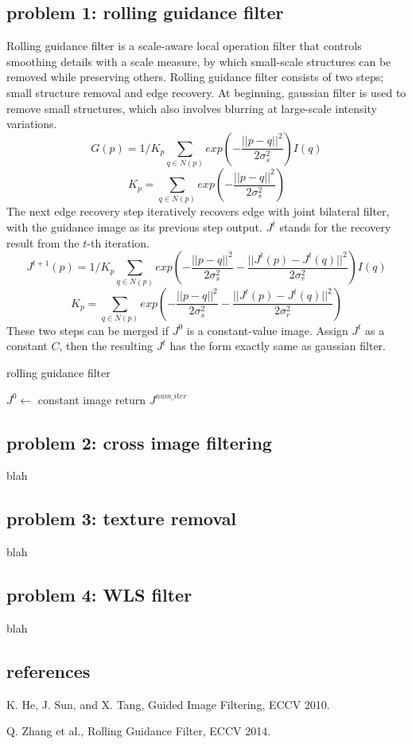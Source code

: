 \documentclass[extendedabs]{bmvc2k}
\begin{document}
\subsection*{problem 1: rolling guidance filter}

Rolling guidance filter \cite{rolling} is a scale-aware local operation filter that controls smoothing
details with a scale measure, by which small-scale structures can be removed while preserving others.
Rolling guidance filter consists of two steps; small structure removal and edge recovery.
At beginning, gaussian filter is used to remove small structures, which also involves blurring at
large-scale intensity variations.
\[G(p) = 1/K_p\sum_{q \in N(p)}exp(-\frac{||p-q||^2}{2\sigma_s^2})I(q)\]
\[K_p = \sum_{q \in N(p)}exp(-\frac{||p-q||^2}{2\sigma_s^2})\]
The next edge recovery step iteratively recovers edge with joint bilateral filter, with the guidance
image as its previous step output. $J^t$ stands for the recovery result from the $t$-th iteration.
\[J^{t+1}(p) = 1/K_p\sum_{q \in N(p)}exp(-\frac{||p-q||^2}{2\sigma_s^2}-\frac{||J^t(p)-J^t(q)||^2}{2\sigma_r^2})I(q)\]
\[K_p = \sum_{q \in N(p)}exp(-\frac{||p-q||^2}{2\sigma_s^2}-\frac{||J^t(p)-J^t(q)||^2}{2\sigma_r^2})\]
These two steps can be merged if $J^0$ is a constant-value image. Assign $J^t$ as a constant $C$, then
the resulting $J^t$ has the form exactly same as gaussian filter.

\begin{algorithm}
\caption{rolling guidance filter}
    $J^0 \gets$ constant image\;
    return $J^{num\_iter}$\;
\end{algorithm}

\subsection*{problem 2: cross image filtering}

blah

\subsection*{problem 3: texture removal}

blah

\subsection*{problem 4: WLS filter}

blah

\subsection*{references}

\begin{thebibliography}{9}
    K. He, J. Sun, and X. Tang, Guided Image Filtering, ECCV 2010.
    
    Q. Zhang et al., Rolling Guidance Filter, ECCV 2014.
\end{thebibliography}
\end{document}
